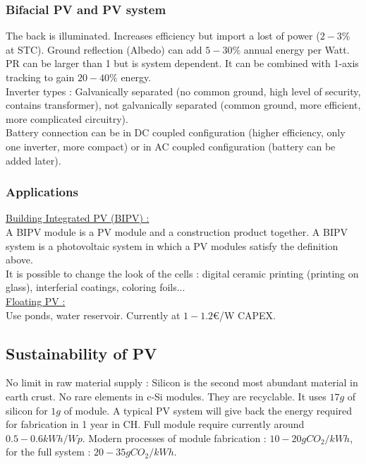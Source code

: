\documentclass[../main.tex]{subfiles}
\begin{document}
\subsubsection{Bifacial PV and PV system}
The back is illuminated. Increases efficiency but import a lost of power ($2-3\%$ at STC). Ground reflection (Albedo) can add $5-30\%$ annual energy per Watt. PR can be larger than 1 but is system dependent. It can be combined with 1-axis tracking to gain $20-40\%$ energy.\\

Inverter types : Galvanically separated (no common ground, high level of security, contains transformer), not galvanically separated (common ground, more efficient, more complicated circuitry).\\

Battery connection can be in DC coupled configuration (higher efficiency, only one inverter, more compact) or in AC coupled configuration (battery can be added later). \\

\subsubsection{Applications}
\quad \underline{Building Integrated PV (BIPV) :} \\
A BIPV module is a PV module and a construction product together. A BIPV system is a photovoltaic system in which a PV modules satisfy the definition above.\\

It is possible to change the look of the cells : digital ceramic printing (printing on glass), interferial coatings, coloring foils...\\

\quad \underline{Floating PV :}\\
Use ponds, water reservoir. Currently at $1-1.2$€/W CAPEX. \\

\subsection{Sustainability of PV}
No limit in raw material supply : Silicon is the second most abundant material in earth crust. No rare elements in c-Si modules. They are recyclable. It uses $17g$ of silicon for $1g$ of module. A typical PV system will give back the energy required for fabrication in 1 year in CH. Full module require currently around $0.5-0.6kWh/Wp$. Modern processes of module fabrication : $10-20g CO_2/kWh$, for the full system : $20-35gCO_2/kWh$.\\
\end{document}

